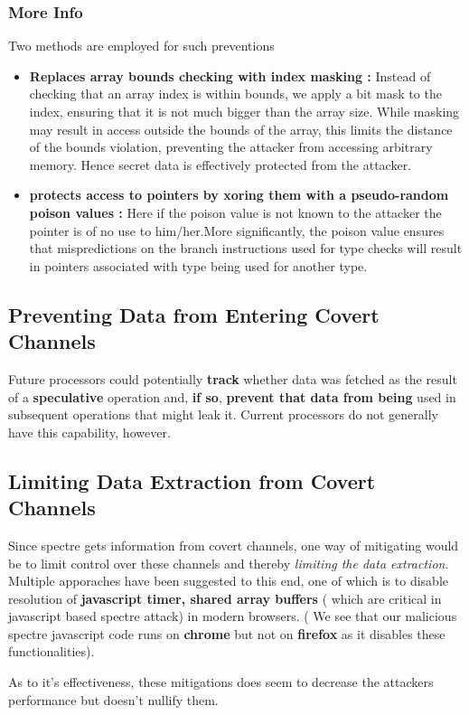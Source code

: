 \documentclass[12pt]{article}
\begin{document}
\subsubsection{More Info}
Two methods are employed for such preventions
\begin{itemize}
	\item \textbf{Replaces array bounds checking with index masking	:} Instead of checking that an array index is within bounds, we apply a bit mask to the index, ensuring that it is not much bigger than the array size. While masking may result in access outside the bounds of the array, this limits the distance of the bounds violation, preventing the attacker from accessing arbitrary memory. Hence secret data is effectively protected from the attacker.
	\item \textbf{protects access to pointers by xoring them with a pseudo-random poison values	:} Here if the poison value is not known to the attacker the pointer is of no use to him/her.More significantly, the poison value ensures that mispredictions on the branch instructions used for type checks will result in pointers associated with type being used for another type.
\end{itemize}
\subsection{Preventing Data from Entering Covert Channels}
Future processors could potentially \textbf{track} whether data was
fetched as the result of a \textbf{speculative} operation and, \textbf{if so},
\textbf{prevent that data from being} used in subsequent operations
that might leak it. Current processors do not generally have
this capability, however.
\subsection{Limiting Data Extraction from Covert Channels}
Since spectre gets information from covert channels, one way of mitigating would be to limit control over these channels and thereby \textit{limiting the data extraction}. Multiple apporaches have been suggested to this end, one of which is to disable resolution of \textbf{javascript timer, shared array buffers} ( which are critical in javascript based spectre attack) in modern browsers. ( We see that our malicious spectre javascript code runs on \textbf{chrome} but not on \textbf{firefox} as it disables these functionalities).

As to it's effectiveness, these mitigations does seem to decrease the attackers performance but doesn't nullify them.
\end{document}
